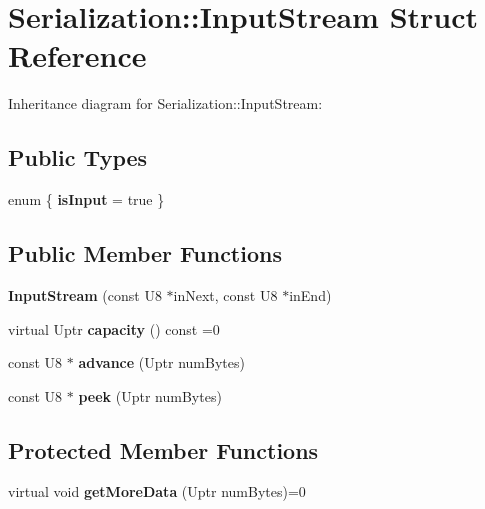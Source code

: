 \hypertarget{struct_serialization_1_1_input_stream}{}\section{Serialization\+:\+:Input\+Stream Struct Reference}
\label{struct_serialization_1_1_input_stream}


Inheritance diagram for Serialization\+:\+:Input\+Stream\+:
\subsection*{Public Types}
\begin{DoxyCompactItemize}
\item 
\mbox{\label{struct_serialization_1_1_input_stream_a4ae57f5c560c97a0b37f6aca678b6042}} 
enum \{ {\bfseries is\+Input} = true
 \}
\end{DoxyCompactItemize}
\subsection*{Public Member Functions}
\begin{DoxyCompactItemize}
\item 
\mbox{\label{struct_serialization_1_1_input_stream_aab2721dd35672f8484a4e4045fd03e9f}} 
{\bfseries Input\+Stream} (const U8 $\ast$in\+Next, const U8 $\ast$in\+End)
\item 
\mbox{\label{struct_serialization_1_1_input_stream_a960a261ed276a5f6e81472739c0958ca}} 
virtual Uptr {\bfseries capacity} () const =0
\item 
\mbox{\label{struct_serialization_1_1_input_stream_a9169d0c0f944437fa6308d4264592984}} 
const U8 $\ast$ {\bfseries advance} (Uptr num\+Bytes)
\item 
\mbox{\label{struct_serialization_1_1_input_stream_ae5e2523c34d201e5f80581f456a01d55}} 
const U8 $\ast$ {\bfseries peek} (Uptr num\+Bytes)
\end{DoxyCompactItemize}
\subsection*{Protected Member Functions}
\begin{DoxyCompactItemize}
\item 
\mbox{\label{struct_serialization_1_1_input_stream_a888d6a1c0486a2bd4024f1f5c9be2d22}} 
virtual void {\bfseries get\+More\+Data} (Uptr num\+Bytes)=0
\end{DoxyCompactItemize}
